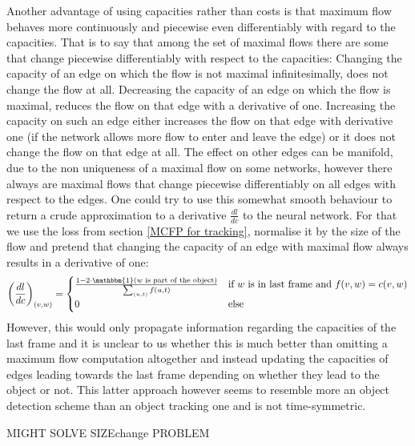 \documentclass{article}
\begin{document}
Another advantage of using capacities rather than costs is that maximum flow behaves more continuously and piecewise even differentiably with regard to the capacities. That is to say that among the set of maximal flows there are some that change piecewise differentiably with respect to the capacities:  Changing the capacity of an edge on which the flow is not maximal infinitesimally, does not change the flow at all. Decreasing the capacity of an edge on which the flow is maximal, reduces the flow on that edge with a derivative of one. Increasing the capacity on such an edge either increases the flow on that edge with derivative one (if the network allows more flow to enter and leave the edge) or it does not change the flow on that edge at all. The effect on other edges can be manifold, due to the non uniqueness of a maximal flow on some networks, however there always are maximal flows that change piecewise differentiably on all edges with respect to the edges. One could try to use this somewhat smooth behaviour to return a crude approximation to a derivative $\frac{dl}{dc}$ to the neural network. For that we use the loss from section \ref{MCFP for tracking}, normalise it by the size of the flow and pretend that changing the capacity of an edge with maximal flow always results in a derivative of one: 
\begin{align*}
\left(\frac{dl}{dc}\right)_{(v,w)} = 
\begin{cases}
\frac{1 - 2 \cdot \mathbbm{1}(w\textnormal{ is part of the object})}{\sum_{(u,t)} f(u,t)} &\textnormal{if } w \textnormal{ is in last frame and } f(v,w) = c(v,w)\\
0 &\textnormal{else}
\end{cases}
\end{align*}
However, this would only propagate information regarding the capacities of the last frame and it is unclear to us whether this is much better than omitting a maximum flow computation altogether and instead updating the capacities of edges leading towards the last frame depending on whether they lead to the object or not. This latter approach however seems to resemble more an object detection scheme than an object tracking one and is not time-symmetric.

MIGHT SOLVE SIZEchange PROBLEM
\end{document}
